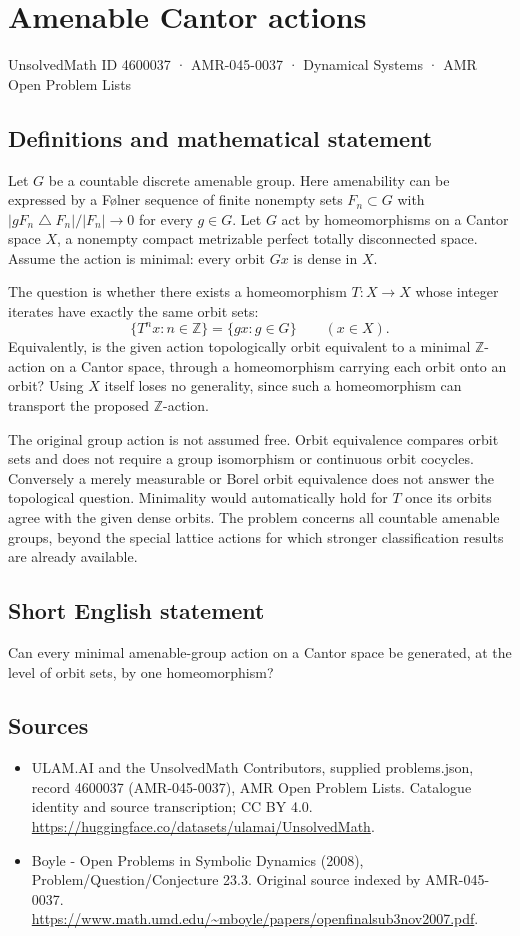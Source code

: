 \documentclass[11pt,a4paper]{article}
\begin{document}
\section*{Amenable Cantor actions}\label{4600037}
{\small UnsolvedMath ID 4600037 · AMR-045-0037 · Dynamical Systems · AMR Open Problem Lists}
\subsection{Definitions and mathematical statement}
Let $G$ be a countable discrete amenable group. Here amenability can be
expressed by a Følner sequence of finite nonempty sets $F_n\subset G$
with $|gF_n\mathbin{\triangle} F_n|/|F_n|\to0$ for every $g\in G$.
Let $G$ act by homeomorphisms on a Cantor space $X$, a nonempty compact
metrizable perfect totally disconnected space. Assume the action is
minimal: every orbit $Gx$ is dense in $X$.

The question is whether there exists a homeomorphism $T:X\to X$ whose
integer iterates have exactly the same orbit sets:
\[
 \{T^n x:n\in\mathbb Z\}=\{gx:g\in G\}
                \qquad(x\in X).
\]
Equivalently, is the given action topologically orbit equivalent to a
minimal $\mathbb Z$-action on a Cantor space, through a homeomorphism
carrying each orbit onto an orbit? Using $X$ itself loses no generality,
since such a homeomorphism can transport the proposed $\mathbb Z$-action.

The original group action is not assumed free. Orbit equivalence
compares orbit sets and does not require a group isomorphism or
continuous orbit cocycles. Conversely a merely measurable or Borel
orbit equivalence does not answer the topological question. Minimality
would automatically hold for $T$ once its orbits agree with the given
dense orbits. The problem concerns all countable amenable groups, beyond
the special lattice actions for which stronger classification results
are already available.
\subsection{Short English statement}
Can every minimal amenable-group action on a Cantor space be generated, at the level of orbit sets, by one homeomorphism?
\subsection{Sources}
\begin{itemize}
\item[S1] ULAM.AI and the UnsolvedMath Contributors, supplied problems.json, record 4600037 (AMR-045-0037), AMR Open Problem Lists. Catalogue identity and source transcription; CC BY 4.0.
\url{https://huggingface.co/datasets/ulamai/UnsolvedMath}.
\item[S2] Boyle - Open Problems in Symbolic Dynamics (2008), Problem/Question/Conjecture 23.3. Original source indexed by AMR-045-0037.
\url{https://www.math.umd.edu/~mboyle/papers/openfinalsub3nov2007.pdf}.
\end{itemize}
\end{document}

